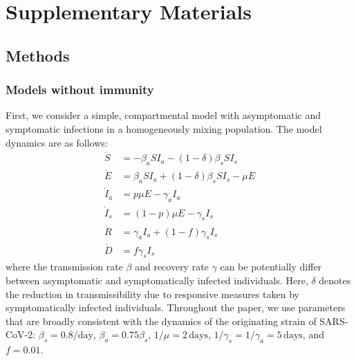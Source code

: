\documentclass[12pt]{article}
\begin{document}
\pagebreak

\section*{Supplementary Materials}
\setcounter{figure}{0}
\renewcommand{\thefigure}{S\arabic{figure}}

\subsection*{Methods}

\subsubsection*{Models without immunity}

First, we consider a simple, compartmental model with asymptomatic and symptomatic infections in a homogeneously mixing population.
The model dynamics are as follows:
\begin{align}
\dot{S} &= -\beta_a S I_a -(1-\delta) \beta_s S I_s \\
\dot{E} &= \beta_a S I_a + (1-\delta) \beta_s S I_s - \mu E\\
\dot{I}_a &= p \mu E - \gamma_a I_a\\
\dot{I}_s &= (1-p) \mu E -\gamma_s I_s\\
\dot{R} &= \gamma_a I_a + (1-f) \gamma_s I_s \\
\dot{D} &= f \gamma_s I_s
\end{align}
where the transmission rate $\beta$ and recovery rate $\gamma$ can be potentially differ between asymptomatic and symptomatically infected individuals.  
Here, $\delta$ denotes the reduction in transmissibility due to responsive measures taken by symptomatically infected individuals.
Throughout the paper, we use parameters that are broadly consistent with the dynamics of the originating strain of SARS-CoV-2: $\beta_s = 0.8/\mathrm{day}$, $\beta_a = 0.75 \beta_s$, $1/\mu=2\,\mathrm{days}$, $1/\gamma_s=1/\gamma_a=5\,\mathrm{days}$, and $f=0.01$.
\end{document}
